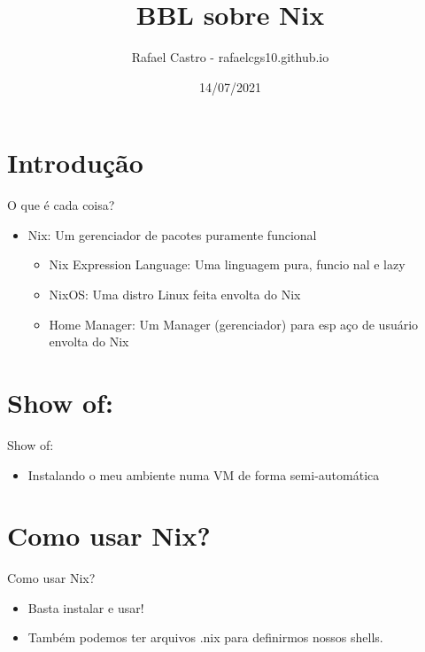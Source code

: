 \documentclass[presentation]{beamer}
\author{Rafael Castro - rafaelcgs10.github.io}
\date{14/07/2021}
\title{BBL sobre Nix}
\begin{document}
\maketitle

\section{Introdução}
\label{sec:orgf3437bf}

\begin{frame}[label={sec:org53322b8}]{O que é cada coisa?}
\begin{itemize}
\item Nix: Um gerenciador de pacotes \alert{puramente funcional}
\begin{itemize}
\item Nix Expression Language: Uma linguagem pura, funcio  nal e lazy
\item NixOS: Uma distro Linux feita envolta do Nix
\item Home Manager: Um Manager (gerenciador) para esp    aço de usuário   envolta do Nix
\end{itemize}
\end{itemize}
\end{frame}

\section{Show of:}
\label{sec:org9b2dd94}

\begin{frame}[label={sec:org9ebcac4}]{Show of:}
\begin{itemize}
\item Instalando o meu ambiente numa VM de forma semi-automática
\end{itemize}
\end{frame}

\section{Como usar Nix?}
\label{sec:org9981ac5}

\begin{frame}[label={sec:org33870f0}]{Como usar Nix?}
\begin{itemize}
\item Basta instalar e usar!
\item Também podemos ter arquivos .nix para definirmos nossos shells.
\end{itemize}
\end{frame}
\end{document}
